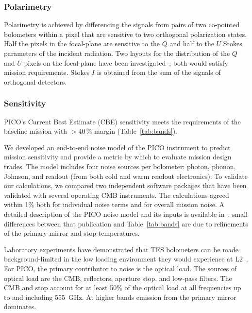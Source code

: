 

\subsubsection{Polarimetry}
\label{sec:polarimetry} %

Polarimetry is achieved by differencing the signals from pairs of two co-pointed bolometers within a pixel that are sensitive to two orthogonal polarization states. Half the pixels in the focal-plane are sensitive to the $Q$ and half to the $U$ Stokes parameters of the incident radiation. Two layouts for the distribution of the $Q$ and $U$ pixels on the focal-plane have been investigated~\citep{picoweb_QU}; both would satisfy mission requirements. Stokes $I$ is obtained from the sum of the signals of orthogonal detectors.  

\subsubsection{Sensitivity}
\label{sec:sensitivity} %

PICO's Current Best Estimate (CBE) sensitivity meets the requirements of the baseline mission with \hbox{$>40\,\%$} margin (Table~\ref{tab:bands}).

We developed an end-to-end noise model of the PICO instrument to predict mission sensitivity and provide a metric by which to evaluate mission design trades. The model includes four noise sources per bolometer: photon, phonon, Johnson, and readout (from both cold and warm readout electronics). To validate our calculations, we compared two independent software packages that have been validated with several operating CMB instruments. The calculations agreed within 1\% both for individual noise terms and for overall mission noise. A detailed description of the PICO noise model and its inputs is available in~\citet{Young2018}; small differences between that publication and Table~\ref{tab:bands} are due to refinements of the primary mirror and stop temperatures.

Laboratory experiments have demonstrated that TES bolometers can be made background-limited in the low loading environment they would experience at L2~\citep{Beyer2012}. For PICO, the primary contributor to noise is the optical load. The sources of optical load are the CMB, reflectors, aperture stop, and low-pass filters. The CMB and stop account for at least 50\% of the optical load at all frequencies up to and including 555~GHz. At higher bands emission from the primary mirror dominates.

